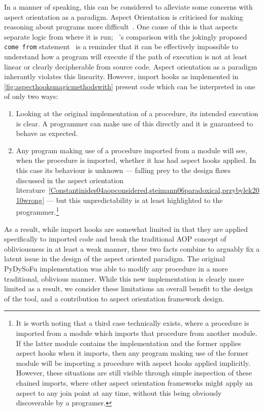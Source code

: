 In a manner of speaking, this can be considered to alleviate some concerns with
aspect orientation as a paradigm. Aspect Orientation is criticised for making
reasoning about programs more
difficult~\cite{przybylek2010wrong,Constantinides04aopconsidered,steimann06paradoxical}.
One cause of this is that aspects separate logic from where it is run;
\citeauthor{Constantinides04aopconsidered}~'s comparison with the jokingly
proposed \lstinline{come from}
statement~\cite{clark73comefrom,Constantinides04aopconsidered} is a reminder
that it can be effectively impossible to understand how a program will execute
if the path of execution is not at least linear or clearly decipherable from
source code. Aspect orientation as a paradigm inherantly violates this
linearity. However, import hooks as implemented in
\cref{fig:aspecthooksmagicmethodswith} present code which can be interpreted in
one of only two ways:

\begin{enumerate}
    \item Looking at the original implementation of a procedure, its intended
    execution is clear. A programmer can make use of this directly and it is
    guaranteed to behave as expected.
    \item Any program making use of a procedure imported from a module will see,
    when the procedure is imported, whether it has had aspect hooks applied. In
    this case its behaviour is unknown --- falling prey to the design flaws
    discussed in the aspect orientation
    literature~\cref{Constantinides04aopconsidered,steimann06paradoxical,przybylek2010wrong}
    --- but this unpredictability is at least highlighted to the
    programmer.\footnote{It is worth noting that a third case technically
    exists, where a procedure is imported from a module which imports that
    procedure from another module. If the latter module contains the
    implementation and the former applies aspect hooks when it imports, then any
    program making use of the former module will be importing a procedure with
    aspect hooks applied implicitly. However, these situations are still visible
    through simple inspection of these chained imports, where other aspect
    orientation frameworks might apply an aspect to any join point at any time,
    without this being obviously discoverable by a programer.}
\end{enumerate}

As a result, while import hooks are somewhat limited in that they are applied
specifically to imported code and break the traditional AOP concept of
obliviousness in at least a weak manner, these two facts combine to arguably fix
a latent issue in the design of the aspect oriented paradigm. The original
PyDySoFu implementation was able to modify any procedure in a more traditional,
oblivious manner. While this new implementation is clearly more limited as a
result, we consider these limitations an overall benefit to the design of the
tool, and a contribution to aspect orientation framework design.


